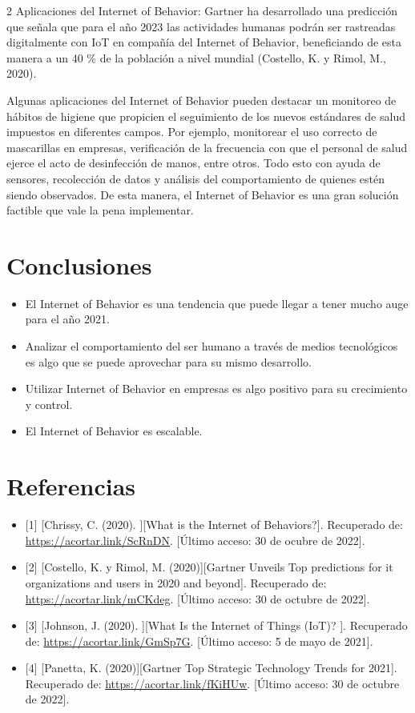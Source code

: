 \documentclass[12pt,spanish,Letterpaper,openany]{book}
\begin{document}
\begin {multicols}{2}
Aplicaciones del Internet of Behavior:
Gartner ha desarrollado una predicción que señala que para el año 2023 las actividades humanas podrán ser rastreadas digitalmente con IoT en compañía del Internet of Behavior, beneficiando de esta manera a un 40 \% de la población a nivel mundial (Costello, K. y Rimol, M., 2020).

Algunas aplicaciones del Internet of Behavior pueden destacar un monitoreo de hábitos de higiene que propicien el seguimiento de los nuevos estándares de salud impuestos en diferentes campos. Por ejemplo, monitorear el uso correcto de mascarillas en empresas, verificación de la frecuencia con que el personal de salud ejerce el acto de desinfección de manos, entre otros. Todo esto con ayuda de sensores, recolección de datos y análisis del comportamiento de quienes estén siendo observados. De esta manera, el Internet of Behavior es una gran solución factible que vale la pena implementar.

\hypertarget{conclusiones-6}{%
\section{Conclusiones}\label{conclusiones-6}}

\begin{itemize}
\item
  El Internet of Behavior es una tendencia que puede llegar a tener mucho auge para el año 2021.
\item
  Analizar el comportamiento del ser humano a través de medios tecnológicos es algo que se puede aprovechar para su mismo desarrollo.
\item
  Utilizar Internet of Behavior en empresas es algo positivo para su crecimiento y control.
\item
  El Internet of Behavior es escalable.
\end{itemize}

\hypertarget{referencias-5}{%
\section{Referencias}\label{referencias-5}}

\begin{itemize}
\item
  {[}1{]} {[}Chrissy, C. (2020). {]}{[}What is the Internet of Behaviors?{]}. Recuperado de: \url{https://acortar.link/ScRnDN}. {[}Último acceso: 30 de ocubre de 2022{]}.
\item
  {[}2{]} {[}Costello, K. y Rimol, M. (2020){]}{[}Gartner Unveils Top predictions for it organizations and users in 2020 and beyond{]}. Recuperado de: \url{https://acortar.link/mCKdeg}. {[}Último acceso: 30 de octubre de 2022{]}.
\item
  {[}3{]} {[}Johnson, J. (2020). {]}{[}What Is the Internet of Things (IoT)? {]}. Recuperado de: \url{https://acortar.link/GmSp7G}. {[}Último acceso: 5 de mayo de 2021{]}.
\item
  {[}4{]} {[}Panetta, K. (2020){]}{[}Gartner Top Strategic Technology Trends for 2021{]}. Recuperado de: \url{https://acortar.link/fKiHUw}. {[}Último acceso: 30 de octubre de 2022{]}.
\end{itemize}


\end{multicols}
\end{document}
